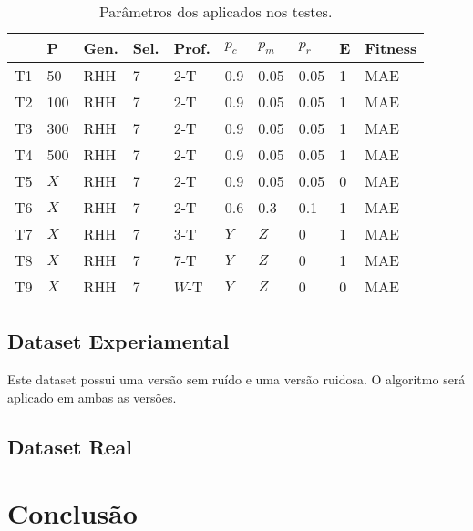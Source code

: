 \documentclass[a4paper]{paper}
\begin{document}
\noindent
\begin{table}[b]
  \caption{Parâmetros dos aplicados nos testes.}
  \label{tbl:tests}
  \begin{tabularx}{1\textwidth}{| X || X | X | X | X | X | X | X | X | X |}

    \hline
    & P   & Gen. & Sel. & Prof. & $p_c$ & $p_m$ & $p_r$ & E & Fitness \\
    \hline
    T1  & 50  & RHH & 7 & 2-T  & 0.9  & 0.05 & 0.05 & 1 & MAE \\
    T2  & 100 & RHH & 7 & 2-T  & 0.9  & 0.05 & 0.05 & 1 & MAE \\
    T3  & 300 & RHH & 7 & 2-T  & 0.9  & 0.05 & 0.05 & 1 & MAE \\
    T4  & 500 & RHH & 7 & 2-T  & 0.9  & 0.05 & 0.05 & 1 & MAE \\
    \hline
    T5  &$X$  & RHH & 7 & 2-T  & 0.9  & 0.05 & 0.05 & 0 & MAE \\
    T6  &$X$  & RHH & 7 & 2-T  & 0.6  & 0.3  & 0.1  & 1 & MAE \\
    \hline
    T7  &$X$  & RHH & 7 & 3-T  &$Y$   & $Z$  & 0    & 1 & MAE \\
    T8  &$X$  & RHH & 7 & 7-T  &$Y$   & $Z$  & 0    & 1 & MAE \\    
    \hline
    T9  &$X$  & RHH & 7 & $W$-T  &$Y$   & $Z$  & 0    & 0 & MAE \\
    \hline
  \end{tabularx}
\end{table}


\subsection{Dataset Experiamental}
Este dataset possui uma versão sem ruído e uma versão ruidosa. O algoritmo será
aplicado em ambas as versões.

\subsection{Dataset Real}

\section{Conclusão}


\citet*{poli2008}


\end{document}
